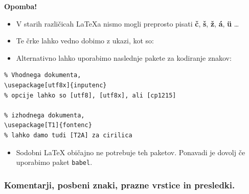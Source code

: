 \begin{framed}
\textbf{Opomba!}\\
\begin{itemize}
\item V starih različicah LaTeXa nismo mogli preprosto pisati \textbf{č}, \textbf{š}, \textbf{ž}, \textbf{á}, \textbf{ü} \dots
\item Te črke lahko vedno dobimo z ukazi, kot so:
\end{itemize}


\begin{itemize}
\item Alternativno lahko uporabimo naslednje pakete za kodiranje znakov:
\end{itemize}

\begin{verbatim}
% Vhodnega dokumenta, 
\usepackage[utf8x]{inputenc} 
% opcije lahko so [utf8], [utf8x], ali [cp1215] 

% izhodnega dokumenta, 
\usepackage[T1]{fontenc} 
% lahko damo tudi [T2A] za cirilica
\end{verbatim}

\begin{itemize}
\item Sodobni LaTeX običajno ne potrebuje teh paketov.
Ponavadi je dovolj če uporabimo paket \texttt{babel}.
\end{itemize}
\end{framed}

\subsubsection{Komentarji, posbeni znaki, prazne vrstice in presledki.}\label{latexUvod_komentari}

